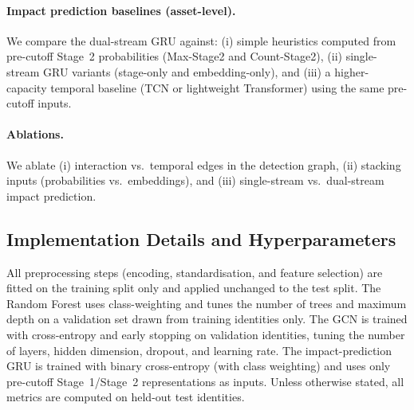 \documentclass[pdflatex,sn-mathphys-num]{sn-jnl}
\theoremstyle{thmstyleone}%
\theoremstyle{thmstyletwo}%
\theoremstyle{thmstylethree}%
\begin{document}
\paragraph{Impact prediction baselines (asset-level).}
We compare the dual-stream GRU against: (i) simple heuristics computed from pre-cutoff Stage~2 probabilities (Max-Stage2 and Count-Stage2), (ii) single-stream GRU variants (stage-only and embedding-only), and (iii) a higher-capacity temporal baseline (TCN or lightweight Transformer) using the same pre-cutoff inputs.

\paragraph{Ablations.}
We ablate (i) interaction vs.\ temporal edges in the detection graph, (ii) stacking inputs (probabilities vs.\ embeddings), and (iii) single-stream vs.\ dual-stream impact prediction.


\subsection{Implementation Details and Hyperparameters}
\label{subsec:implementation_details}

All preprocessing steps (encoding, standardisation, and feature selection) are fitted on the training split only and applied unchanged to the test split. The Random Forest uses class-weighting and tunes the number of trees and maximum depth on a validation set drawn from training identities only. The GCN is trained with cross-entropy and early stopping on validation identities, tuning the number of layers, hidden dimension, dropout, and learning rate. The impact-prediction GRU is trained with binary cross-entropy (with class weighting) and uses only pre-cutoff Stage~1/Stage~2 representations as inputs. Unless otherwise stated, all metrics are computed on held-out test identities.
\end{document}
